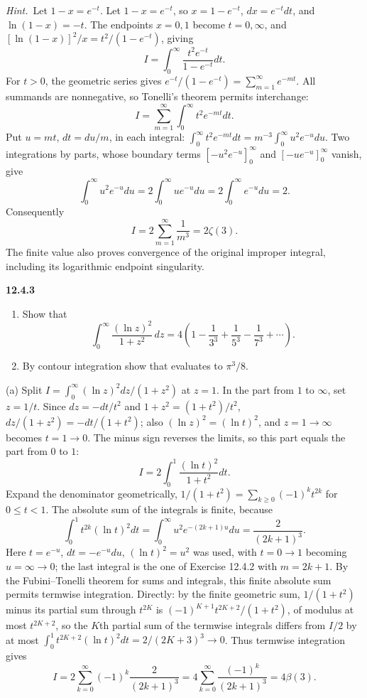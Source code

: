 \emph{Hint.}~Let $1-x=e^{-t}$.
\solution
Let $1-x=e^{-t}$, so $x=1-e^{-t}$, $dx=e^{-t}dt$, and
$\ln(1-x)=-t$. The endpoints $x=0,1$ become $t=0,\infty$, and
$[\ln(1-x)]^2/x=t^2/(1-e^{-t})$, giving
\[
I=\int_0^\infty\frac{t^2e^{-t}}{1-e^{-t}}dt.
\]
For $t>0$, the geometric series gives
$e^{-t}/(1-e^{-t})=\sum_{m=1}^\infty e^{-mt}$.
All summands are nonnegative, so Tonelli's theorem permits interchange:
\[
I=\sum_{m=1}^\infty\int_0^\infty t^2e^{-mt}dt.
\]
Put $u=mt$, $dt=du/m$, in each integral:
$\int_0^\infty t^2e^{-mt}dt=m^{-3}\int_0^\infty u^2e^{-u}du$.
Two integrations by parts, whose boundary terms
$[-u^2e^{-u}]_0^\infty$ and $[-ue^{-u}]_0^\infty$ vanish, give
\[
\int_0^\infty u^2e^{-u}du=2\int_0^\infty ue^{-u}du
=2\int_0^\infty e^{-u}du=2.
\]
Consequently
\[
\boxed{I=2\sum_{m=1}^\infty\frac1{m^3}=2\zeta(3)}.
\]
The finite value also proves convergence of the original improper
integral, including its logarithmic endpoint singularity.

\par\bigskip
\noindent\textbf{12.4.3}\quad
\begin{enumerate}
\item[(a)] Show that
  \[
  \int_{0}^{\infty}\frac{(\ln z)^{2}}{1+z^{2}}\,dz
  =4\left(1-\frac{1}{3^{3}}+\frac{1}{5^{3}}-\frac{1}{7^{3}}+\cdots\right).
  \]
\item[(b)] By contour integration show that  evaluates to $\pi^{3}/8$.
\end{enumerate}
\solution
(a) Split $I=\int_0^\infty(\ln z)^2dz/(1+z^2)$ at $z=1$. In the part
from $1$ to $\infty$, set $z=1/t$. Since $dz=-dt/t^2$ and
$1+z^2=(1+t^2)/t^2$, $dz/(1+z^2)=-dt/(1+t^2)$; also
$(\ln z)^2=(\ln t)^2$, and $z=1\to\infty$ becomes $t=1\to0$. The minus
sign reverses the limits, so this part equals the part from $0$ to $1$:
\[
I=2\int_0^1\frac{(\ln t)^2}{1+t^2}dt.
\]
Expand the denominator geometrically,
$1/(1+t^2)=\sum_{k\ge0}(-1)^kt^{2k}$ for $0\le t<1$. The absolute sum of
the integrals is finite, because
\[
\int_0^1t^{2k}(\ln t)^2dt
=\int_0^\infty u^2e^{-(2k+1)u}du=\frac2{(2k+1)^3}.
\]
Here $t=e^{-u}$, $dt=-e^{-u}du$, $(\ln t)^2=u^2$ was used, with
$t=0\to1$ becoming $u=\infty\to0$; the last integral is the one of
Exercise 12.4.2 with $m=2k+1$. By the Fubini--Tonelli theorem for sums
and integrals, this finite absolute sum permits termwise integration.
Directly: by the finite geometric sum,
$1/(1+t^2)$ minus its partial sum through $t^{2K}$ is
$(-1)^{K+1}t^{2K+2}/(1+t^2)$, of modulus at most $t^{2K+2}$, so the $K$th
partial sum of the termwise integrals differs from $I/2$ by at most
$\int_0^1t^{2K+2}(\ln t)^2dt=2/(2K+3)^3\to0$. Thus termwise integration
gives
\[
\boxed{I=2\sum_{k=0}^\infty(-1)^k\frac{2}{(2k+1)^3}
=4\sum_{k=0}^\infty\frac{(-1)^k}{(2k+1)^3}=4\beta(3)}.
\]

